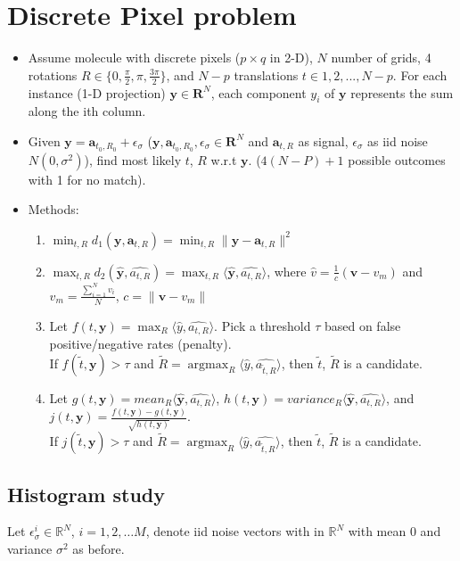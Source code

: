 \documentclass[11pt]{article}
\newcommand{\by}{\boldsymbol{y}}
\DeclareMathOperator*{\argmax}{argmax}
\begin{document}
\section{Discrete Pixel problem}
\begin{itemize}
    \item Assume molecule with discrete pixels ($p \times q$ in 2-D), $N$ number of grids, 4 rotations $R \in \{0, \frac{\pi}{2}, \pi, \frac{3\pi}{2}\}$, and $N-p$ translations $t \in {1,2,...,N-p}$. For each instance (1-D projection) $\mathbf{y} \in \mathbf{R}^N$, each component $y_i$ of $\mathbf{y}$ represents the sum along the ith column. 
    \item Given $\mathbf{y} =  \mathbf{a}_{t_0,R_0} + \epsilon_\sigma$ ($\mathbf{y}, \mathbf{a}_{t_0,R_0}, \epsilon_\sigma \in \mathbf{R}^N$ and $ \mathbf{a}_{t,R}$ as signal, $\epsilon_\sigma$ as iid noise $N(0, \sigma^2)$), find most likely $t$, $R$ w.r.t $\mathbf{y}$. ($4(N-P)+1$ possible outcomes with 1 for no match).
    \item Methods:
    \begin{enumerate}
        \item $\min_{t,R} d_{1}(\by,\mathbf{a}_{t,R}) = \min_{t, R} \lVert \by- \mathbf{a}_{t,R}\rVert^2$
        \item $\max_{t,R} d_{2}(\hat{\by}, \hat{a_{t,R}}) = \max_{t,R} \langle \hat{\by}, \hat{a_{t,R}} \rangle$, where $\hat{v} = \frac{1}{c}(\mathbf{v} - v_m)$ and $v_m = \frac{\sum_{i=1}^N v_i}{N}$, $c = \lVert \mathbf{v}- v_m\rVert$
        \item Let $f(t,\by) = \max_R \langle \hat{y}, \hat{a_{t,R}} \rangle$. Pick a threshold $\tau$ based on false positive/negative rates (penalty).\\
        If $f(\widetilde{t},\by) > \tau$ and $\widetilde{R} = \argmax_R \langle \hat{y}, \hat{a_{\widetilde{t},R}} \rangle$, then $\widetilde{t}$, $\widetilde{R}$ is a candidate.
        \item Let $g(t,\by) = {mean}_R \langle \hat{\by}, \hat{a_{t,R}} \rangle$, $h(t,\by) = {variance}_R  \langle \hat{\by}, \hat{a_{t,R}} \rangle$, and $j(t,\by) = \frac{f(t,\by)-g(t,\by)}{\sqrt{h(t,\by)}}$. \\
        If $j(\widetilde{t},\by) > \tau$ and $\widetilde{R} = \argmax_R \langle \hat{y}, \hat{a_{\widetilde{t},R}} \rangle$, then $\widetilde{t}$, $\widetilde{R}$ is a candidate.
    \end{enumerate}
\end{itemize}


\subsection{Histogram study}
Let $\epsilon_{\sigma}^{i}  \in \mathbb{R}^{N}$, $i=1,2,\ldots M$, denote iid noise vectors with in $\mathbb{R}^{N}$ with mean $0$ and variance $\sigma^2$ as before. 
\end{document}
